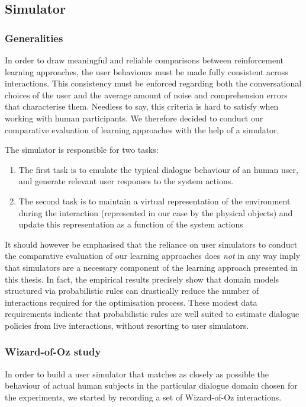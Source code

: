 \subsection{Simulator}

\subsubsection*{Generalities}

In order to draw meaningful and reliable comparisons between reinforcement learning approaches, the user behaviours must be made fully consistent across interactions.  This consistency must be enforced regarding both the conversational choices of the user and the average amount of noise and comprehension errors that characterise them. Needless to say, this criteria is hard to satisfy when working with human participants.  We therefore decided to conduct our comparative evaluation of learning approaches with the help of a simulator.

The simulator is responsible for two tasks:
\begin{enumerate}
\item The first task is to emulate the typical dialogue behaviour of an human user, and generate relevant user responses to the system actions.  
\item The second task is to maintain a virtual representation of the environment during the interaction (represented in our case by the physical objects) and update this representation as a function of the system actions
\end{enumerate}

It should however be emphasised that the reliance on user simulators to conduct the comparative evaluation of our learning approaches does \textit{not} in any way imply that simulators are a necessary component of the learning approach presented in this thesis. In fact, the empirical results precisely show that domain models structured via probabilistic rules can drastically reduce the number of interactions required for the optimisation process.  These modest data requirements indicate that probabilistic rules are well suited to estimate dialogue policies from live interactions, without resorting to user simulators. 

\subsubsection*{Wizard-of-Oz study}

In order to build a user simulator that matches as closely as possible the behaviour of actual human subjects in the particular dialogue domain chosen for the experiments, we started by recording a set of Wizard-of-Oz interactions. 

